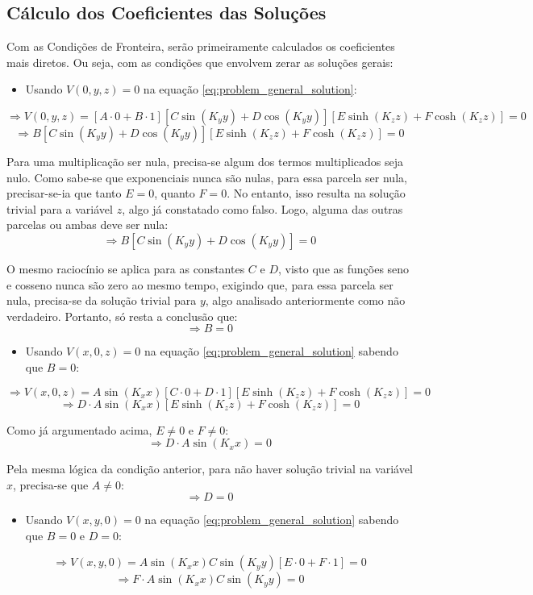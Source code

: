 \documentclass{report}
\begin{document}
\subsection{Cálculo dos Coeficientes das Soluções}

Com as Condições de Fronteira, serão primeiramente calculados os coeficientes mais diretos.
Ou seja, com as condições que envolvem zerar as soluções gerais:

\begin{itemize}
  \item Usando $ V(0, y, z) = 0 $ na equação \ref{eq:problem_general_solution}:
\end{itemize}
$$ \Rightarrow V(0, y, z) = [A \cdot 0 + B \cdot 1][C\sin(K_yy) + D\cos(K_yy)][E\sinh(K_zz) + F\cosh(K_zz)] = 0 $$
$$ \Rightarrow B[C\sin(K_yy) + D\cos(K_yy)][E\sinh(K_zz) + F\cosh(K_zz)] = 0 $$

Para uma multiplicação ser nula, precisa-se algum dos termos multiplicados seja nulo. Como sabe-se que
exponenciais nunca são nulas, para essa parcela ser nula, precisar-se-ia que tanto $ E = 0 $, quanto $ F = 0 $.
No entanto, isso resulta na solução trivial para a variável $ z $, algo já constatado como falso. Logo, alguma
das outras parcelas ou ambas deve ser nula:
$$ \Rightarrow B[C\sin(K_yy) + D\cos(K_yy)] = 0 $$

O mesmo raciocínio se aplica para as constantes $ C $ e $ D $, visto que as funções seno e cosseno nunca são zero
ao mesmo tempo, exigindo que, para essa parcela ser nula, precisa-se da solução trivial para $ y $, algo analisado
anteriormente como não verdadeiro. Portanto, só resta a conclusão que:
$$ \Rightarrow B = 0 $$

\begin{itemize}
  \item Usando $ V(x, 0, z) = 0 $ na equação \ref{eq:problem_general_solution} sabendo que $ B = 0 $:
\end{itemize}
$$ \Rightarrow V(x, 0, z) = A\sin(K_xx)[C\cdot 0 + D\cdot 1][E\sinh(K_zz) + F\cosh(K_zz)] = 0 $$
$$ \Rightarrow D\cdot A\sin(K_xx)[E\sinh(K_zz) + F\cosh(K_zz)] = 0 $$

Como já argumentado acima, $ E \neq 0 $ e $ F \neq 0 $:
$$ \Rightarrow D\cdot A\sin(K_xx) = 0 $$

Pela mesma lógica da condição anterior, para não haver solução trivial na variável $ x $, precisa-se que $ A \neq 0 $:
$$ \Rightarrow D = 0 $$

\begin{itemize}
  \item Usando $ V(x, y, 0) = 0 $ na equação \ref{eq:problem_general_solution} sabendo que $ B = 0 $ e $ D = 0 $:
\end{itemize}
$$ \Rightarrow V(x, y, 0) = A\sin(K_xx)C\sin(K_yy)[E\cdot 0 + F\cdot 1] = 0 $$
$$ \Rightarrow F\cdot A\sin(K_xx)C\sin(K_yy) = 0 $$
\end{document}

